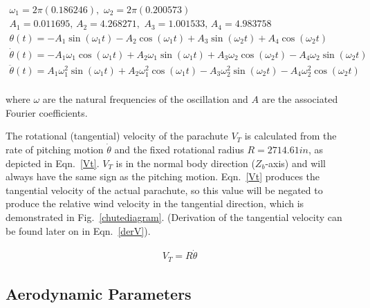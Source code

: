 \documentclass[]{aiaa-tc}%
\begin{document}
\begin{equation}
\begin{gathered}
\omega_1 = 2\pi(0.186246),\,\,\omega_2 = 2\pi(0.200573) \\
A_1 = 0.011695,\,A_2 = 4.268271,\,\,A_3 = 1.001533,\,A_4 = 4.983758 \\
\theta(t) =        - A_1 \sin(\omega_1 t)
                   - A_2 \cos(\omega_1 t)
                   + A_3 \sin(\omega_2 t)
                   + A_4 \cos(\omega_2 t) \\
\dot{\theta}(t) =  - A_1 \omega_1 \cos(\omega_1 t)
                   + A_2 \omega_1 \sin(\omega_1 t)
                   + A_3 \omega_2 \cos(\omega_2 t)
                   - A_4 \omega_2 \sin(\omega_2 t) \\
\ddot{\theta}(t) =   A_1 \omega_1^2 \sin(\omega_1 t)
                   + A_2 \omega_1^2 \cos(\omega_1 t)
                   - A_3 \omega_2^2 \sin(\omega_2 t)
                   - A_4 \omega_2^2 \cos(\omega_2 t) \\
\end{gathered}
\label{fft}
\end{equation}

\noindent where $\omega$ are the natural frequencies of the oscillation and $A$ are the associated Fourier coefficients.

The rotational (tangential) velocity of the parachute $V_T$ is calculated from the rate of pitching motion $\dot{\theta}$ and the fixed rotational radius $R=2714.61 in$, as depicted in Eqn.~\ref{Vt}.  $V_T$ is in the normal body direction ($Z_b$-axis) and will always have the same sign as the pitching motion.  Eqn.~\ref{Vt} produces the tangential velocity of the actual parachute, so this value will be negated to produce the relative wind velocity in the tangential direction, which is demonstrated in Fig.~\ref{chutediagram}.  (Derivation of the tangential velocity can be found later on in Eqn.~\ref{derV}).

\begin{equation} \label{Vt}
\begin{gathered}
V_T = R \dot{\theta}
\end{gathered}
\end{equation}

\subsection{Aerodynamic Parameters}
\end{document}
